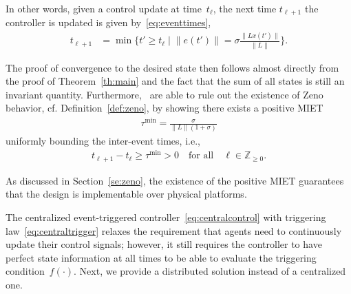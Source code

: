 \documentclass{autart}
\newcommand{\integernonnegative}{\mathbb{Z}_{\ge 0}}
\newcommand{\setdef}[2]{\{#1 \; | \; #2\}}
\newcommand{\TwoNorm}[1]{\|#1\|}
\renewcommand{\hat}{\widehat}
\newcommand{\changes}[1]{{\color{blue} #1}}
\renewcommand{\changes}[1]{#1}
\begin{document}
In other words, given a control update at time~$t_\ell$, the next time
$t_{\ell+1}$ the controller is updated is given by~\eqref{eq:eventtimes}, 
\begin{align*}
  t_{\ell+1} &= \min \setdef{t' \geq t_\ell}{\TwoNorm{e(t')} = \sigma
    \frac{\TwoNorm{Lx(t')}}{\TwoNorm{L}}} .%
\end{align*}

%

The proof of convergence to the desired state then follows almost
directly from the proof of Theorem~\ref{th:main} and the fact that the
sum of all states is still an invariant
quantity. Furthermore,~\cite{DVD-EF-KHJ:12} are able to rule out the
existence of Zeno behavior, cf. Definition~\ref{def:zeno}, \changes{by showing
there exists a positive MIET
\begin{align*}
  \tau^\text{min} = \frac{\sigma}{\TwoNorm{L}(1+\sigma)}
\end{align*}
uniformly bounding the inter-event times, i.e.,
\begin{align}\label{eq:lower-bound}
  t_{\ell+1} - t_\ell \geq \tau^\text{min} > 0 \quad \text{for all} \quad \ell
  \in \integernonnegative. 
\end{align}
}
\changes{As discussed in Section~\ref{se:zeno}, the existence of the positive MIET guarantees that the design is implementable over physical platforms.
}

The centralized event-triggered controller~\eqref{eq:centralcontrol}
with triggering law~\eqref{eq:centraltrigger} relaxes the requirement
that agents need to continuously update their control signals;
however, it still requires the controller to have perfect state
information at all times to be able to evaluate the triggering
condition~$f(\cdot)$. Next, we provide a distributed solution instead of
a centralized one.
\end{document}
